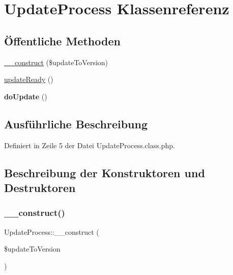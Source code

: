 \hypertarget{class_update_process}{}\section{Update\+Process Klassenreferenz}
\label{class_update_process}
\subsection*{Öffentliche Methoden}
\begin{DoxyCompactItemize}
\item 
\mbox{\hyperlink{class_update_process_a67d97b51b0f793821cc819a4c0f95d23}{\+\_\+\+\_\+construct}} (\$update\+To\+Version)
\item 
\mbox{\hyperlink{class_update_process_aefaedcca35df60648cbd64f9aecef68c}{update\+Ready}} ()
\item 
\mbox{\label{class_update_process_a21bf3c5d05f081eb43bb40799d83f018}} 
{\bfseries do\+Update} ()
\end{DoxyCompactItemize}


\subsection{Ausführliche Beschreibung}


Definiert in Zeile 5 der Datei Update\+Process.\+class.\+php.



\subsection{Beschreibung der Konstruktoren und Destruktoren}
\mbox{\label{class_update_process_a67d97b51b0f793821cc819a4c0f95d23}} 
\subsubsection{\texorpdfstring{\+\_\+\+\_\+construct()}{\_\_construct()}}
{\footnotesize\ttfamily Update\+Process\+::\+\_\+\+\_\+construct (\begin{DoxyParamCaption}\item[{}]{\$update\+To\+Version }\end{DoxyParamCaption})}


